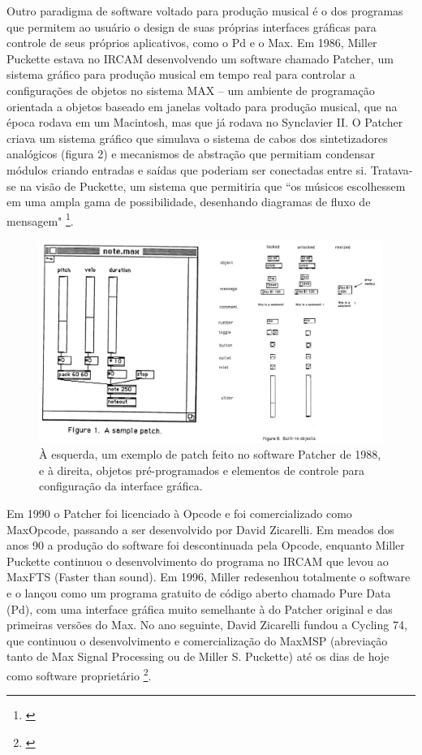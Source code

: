 Outro paradigma de software voltado para produção musical é o dos programas que permitem ao usuário o design de suas próprias interfaces gráficas para controle de seus próprios aplicativos, como o Pd e o Max. Em 1986, Miller Puckette estava no IRCAM desenvolvendo um software chamado Patcher, um sistema gráfico para produção musical em tempo real para controlar a configurações de objetos no sistema MAX – um ambiente de programação orientada a objetos baseado em janelas voltado para produção musical, que na época rodava em um Macintosh, mas que já rodava no Synclavier II. O Patcher criava um sistema gráfico que simulava o sistema de cabos dos sintetizadores analógicos (figura 2) e mecanismos de abstração que permitiam condensar módulos criando entradas e saídas que poderiam ser conectadas entre si. Tratava-se na visão de Puckette, um sistema que permitiria que ``os músicos escolhessem em uma ampla gama de possibilidade, desenhando diagramas de fluxo de mensagem" \footnote{\cite[5]{PucketteMiller}}. 

\begin{figure}
    \caption{\label{patcher}À esquerda, um exemplo de patch feito no software Patcher de 1988, e à direita, objetos pré-programados e elementos de controle para configuração da interface gráfica.}
    
        \includegraphics[width=1\linewidth]{pictures/cap2/patcher}
    
\end{figure}


Em 1990 o Patcher foi licenciado à Opcode e foi comercializado como Max\/Opcode, passando a ser desenvolvido por David Zicarelli. Em meados dos anos 90 a produção do software foi descontinuada pela Opcode, enquanto Miller Puckette continuou o desenvolvimento do programa no IRCAM que levou ao Max\/FTS (Faster than sound). Em 1996, Miller redesenhou totalmente o software e o lançou como um programa gratuito de código aberto chamado Pure Data (Pd), com uma interface gráfica muito semelhante à do Patcher original e das primeiras versões do Max. No ano seguinte, David Zicarelli fundou a Cycling 74, que continuou o desenvolvimento e comercialização do Max\/MSP (abreviação tanto de Max Signal Processing ou de Miller S. Puckette) até os dias de hoje como software proprietário \footnote{\cite{Cryer2018}}.


